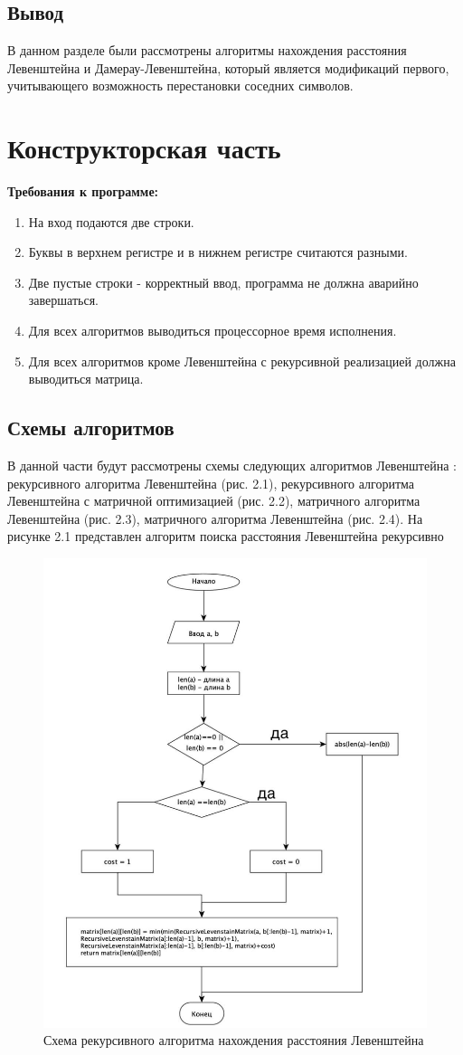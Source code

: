 \documentclass[12pt]{report}
\begin{document}
\section*{Вывод}
	В данном разделе были рассмотрены алгоритмы нахождения расстояния Левенштейна и Дамерау-Левенштейна, который является модификаций первого, учитывающего возможность перестановки соседних символов. 




\chapter{Конструкторская часть}
\textbf{Требования к программе:}
\begin{enumerate}
	\item На вход подаются две строки.
	\item Буквы в верхнем регистре и в нижнем регистре считаются разными.
  	\item Две пустые строки - корректный ввод, программа не должна аварийно завершаться.
  	\item Для всех алгоритмов выводиться процессорное время исполнения.
  	\item Для всех алгоритмов кроме Левенштейна с рекурсивной реализацией должна выводиться матрица.
\end{enumerate}

\section{Схемы алгоритмов}
В данной части будут рассмотрены схемы следующих алгоритмов Левенштейна : рекурсивного алгоритма Левенштейна (рис. 2.1), рекурсивного алгоритма Левенштейна с матричной оптимизацией (рис. 2.2),  матричного алгоритма Левенштейна (рис. 2.3), матричного алгоритма Левенштейна (рис. 2.4).\cite{Levenshtein}
\newpage
\newpage
На рисунке 2.1 представлен алгоритм поиска расстояния Левенштейна рекурсивно
\begin{figure}[h]
    \centering
    \includegraphics[width=0.70\linewidth]{rLev.jpg}
    \caption{Схема рекурсивного алгоритма нахождения расстояния Левенштейна}
    \label{fig:mpr}
\end{figure}
\end{document}
